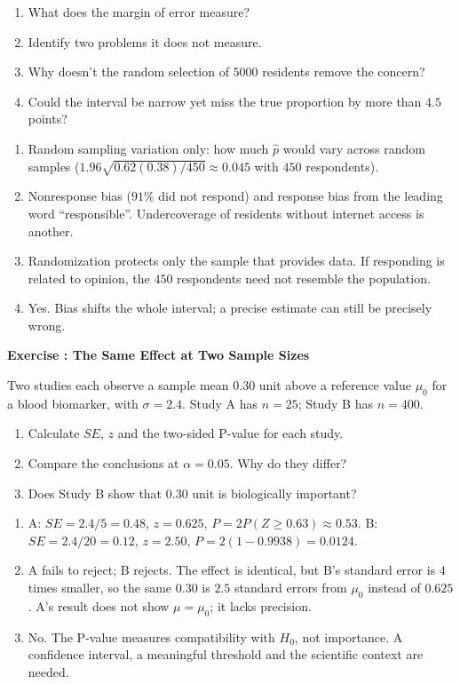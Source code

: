 \documentclass[11pt]{article}
\newcounter{exercise}
\newcommand{\exercise}[1]{%
  \par\medskip
  \refstepcounter{exercise}%
  {\large\bfseries\color{CourseBlue} Exercise \theexercise: #1}\par\smallskip}
\begin{document}
\begin{enumerate}
  \item What does the margin of error measure?
  \item Identify two problems it does not measure.
  \item Why doesn't the random selection of $5000$ residents remove the concern?
  \item Could the interval be narrow yet miss the true proportion by more than $4.5$ points?
\end{enumerate}

\begin{solution}
\begin{enumerate}
  \item Random sampling variation only: how much $\hat p$ would vary across random samples ($1.96\sqrt{0.62(0.38)/450}\approx0.045$ with $450$ respondents).
  \item Nonresponse bias ($91\%$ did not respond) and response bias from the leading word ``responsible''. Undercoverage of residents without internet access is another.
  \item Randomization protects only the sample that provides data. If responding is related to opinion, the $450$ respondents need not resemble the population.
  \item Yes. Bias shifts the whole interval; a precise estimate can still be precisely wrong.
\end{enumerate}
\end{solution}

\exercise{The Same Effect at Two Sample Sizes}

Two studies each observe a sample mean $0.30$ unit above a reference value $\mu_0$ for a blood biomarker, with $\sigma=2.4$. Study A has $n=25$; Study B has $n=400$.

\begin{enumerate}
  \item Calculate $SE$, $z$ and the two-sided P-value for each study.
  \item Compare the conclusions at $\alpha=0.05$. Why do they differ?
  \item Does Study B show that $0.30$ unit is biologically important?
\end{enumerate}

\begin{solution}
\begin{enumerate}
  \item A: $SE=2.4/5=0.48$, $z=0.625$, $P=2P(Z\geq0.63)\approx0.53$. B: $SE=2.4/20=0.12$, $z=2.50$, $P=2(1-0.9938)=0.0124$.
  \item A fails to reject; B rejects. The effect is identical, but B's standard error is $4$ times smaller, so the same $0.30$ is $2.5$ standard errors from $\mu_0$ instead of $0.625$. A's result does not show $\mu=\mu_0$; it lacks precision.
  \item No. The P-value measures compatibility with $H_0$, not importance. A confidence interval, a meaningful threshold and the scientific context are needed.
\end{enumerate}
\end{solution}
\end{document}
